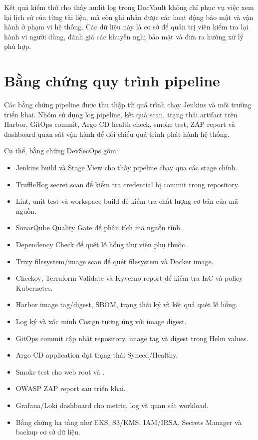 Kết quả kiểm thử cho thấy audit log trong DocVault không chỉ phục vụ việc xem lại lịch sử của từng tài liệu, mà còn ghi nhận được các hoạt động bảo mật và vận hành ở phạm vi hệ thống. Các dữ liệu này là cơ sở để quản trị viên kiểm tra lại hành vi người dùng, đánh giá các khuyến nghị bảo mật và đưa ra hướng xử lý phù hợp.

\section{Bằng chứng quy trình pipeline}

Các bằng chứng pipeline được thu thập từ quá trình chạy Jenkins và môi trường triển khai. Nhóm sử dụng log pipeline, kết quả scan, trạng thái artifact trên Harbor, GitOps commit, Argo CD health check, smoke test, ZAP report và dashboard quan sát vận hành để đối chiếu quá trình phát hành hệ thống.

Cụ thể, bằng chứng DevSecOps gồm:

\begin{itemize}
  \item Jenkins build và Stage View cho thấy pipeline chạy qua các stage chính.
  \item TruffleHog secret scan để kiểm tra credential bị commit trong repository.
  \item Lint, unit test và workspace build để kiểm tra chất lượng cơ bản của mã nguồn.
  \item SonarQube Quality Gate để phân tích mã nguồn tĩnh.
  \item Dependency Check để quét lỗ hổng thư viện phụ thuộc.
  \item Trivy filesystem/image scan để quét filesystem và Docker image.
  \item Checkov, Terraform Validate và Kyverno report để kiểm tra IaC và policy Kubernetes.
  \item Harbor image tag/digest, SBOM, trạng thái ký và kết quả quét lỗ hổng.
  \item Log ký và xác minh Cosign tương ứng với image digest.
  \item GitOps commit cập nhật repository, image tag và digest trong Helm values.
  \item Argo CD application đạt trạng thái Synced/Healthy.
  \item Smoke test cho web root và .
  \item OWASP ZAP report sau triển khai.
  \item Grafana/Loki dashboard cho metric, log và quan sát workload.
  \item Bằng chứng hạ tầng như EKS, S3/KMS, IAM/IRSA, Secrets Manager và backup cơ sở dữ liệu.
\end{itemize}

